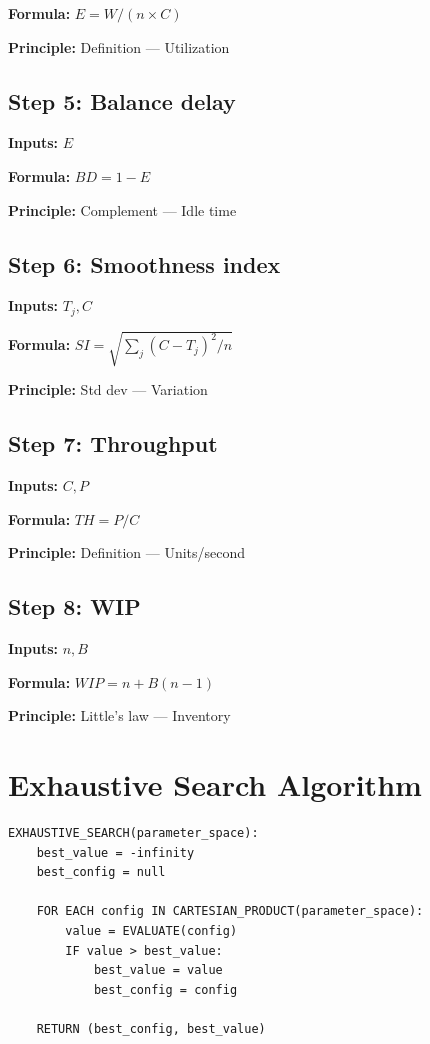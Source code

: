 \documentclass[11pt,twocolumn]{article}
\begin{document}
\textbf{Formula:} $E = W/(n \times C)$

\textbf{Principle:} Definition --- Utilization

\subsection*{Step 5: Balance delay}
\textbf{Inputs:} $E$

\textbf{Formula:} $BD = 1 - E$

\textbf{Principle:} Complement --- Idle time

\subsection*{Step 6: Smoothness index}
\textbf{Inputs:} $T_j, C$

\textbf{Formula:} $SI = \sqrt{\sum_j (C-T_j)^2/n}$

\textbf{Principle:} Std dev --- Variation

\subsection*{Step 7: Throughput}
\textbf{Inputs:} $C, P$

\textbf{Formula:} $TH = P/C$

\textbf{Principle:} Definition --- Units/second

\subsection*{Step 8: WIP}
\textbf{Inputs:} $n, B$

\textbf{Formula:} $WIP = n + B(n-1)$

\textbf{Principle:} Little's law --- Inventory


\section{Exhaustive Search Algorithm}

\begin{verbatim}
EXHAUSTIVE_SEARCH(parameter_space):
    best_value = -infinity
    best_config = null
    
    FOR EACH config IN CARTESIAN_PRODUCT(parameter_space):
        value = EVALUATE(config)
        IF value > best_value:
            best_value = value
            best_config = config
    
    RETURN (best_config, best_value)
\end{verbatim}
\end{document}

